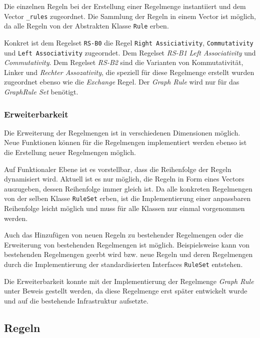 Die einzelnen Regeln bei der Erstellung einer Regelmenge instantiiert und dem Vector \texttt{\_rules} zugeordnet. Die Sammlung der Regeln in einem Vector ist möglich, da alle Regeln von der Abstrakten Klasse \texttt{Rule} erben. 

Konkret ist dem Regelset \texttt{RS-B0} die Regel \texttt{Right Assiciativity}, \texttt{Commutativity} und \texttt{Left Associativity} zugeorndet. Dem Regelset \textit{RS-B1} \textit{Left Associativity} und \textit{Commutativity}. Dem Regelset \textit{RS-B2} sind die Varianten von Kommutativität, Linker und \textit{Rechter Assozativity}, die speziell für diese Regelmenge erstellt wurden zugeordnet ebenso wie die \textit{Exchange} Regel. Der \textit{Graph Rule} wird nur für das \textit{GraphRule Set} benötigt.

\subsubsection{Erweiterbarkeit}
Die Erweiterung der Regelmengen ist in verschiedenen Dimensionen möglich. Neue Funktionen können für die Regelmengen implementiert werden ebenso ist die Erstellung neuer Regelmengen möglich.

Auf Funktionaler Ebene ist es vorstellbar, dass die Reihenfolge der Regeln dynamisiert wird. Aktuell ist es nur möglich, die Regeln in Form eines Vectors auszugeben, dessen Reihenfolge immer gleich ist. Da alle konkreten Regelmengen von der selben Klasse \texttt{RuleSet} erben, ist die Implementierung einer anpassbaren Reihenfolge leicht möglich und muss für alle Klassen nur einmal vorgenommen werden.


Auch das Hinzufügen von neuen Regeln zu bestehender Regelmengen oder die Erweiterung von bestehenden Regelmengen ist möglich. Beispielsweise kann von bestehenden Regelmengen geerbt wird bzw. neue Regeln und deren Regelmengen durch die Implementierung der standardisierten Interfaces \texttt{RuleSet} entstehen.

Die Erweiterbarkeit konnte mit der Implementierung der Regelmenge  \textit{Graph Rule} unter Beweis gestellt werden, da diese Regelmenge erst später entwickelt wurde und auf die bestehende Infrastruktur aufsetzte.




\subsection{Regeln}

